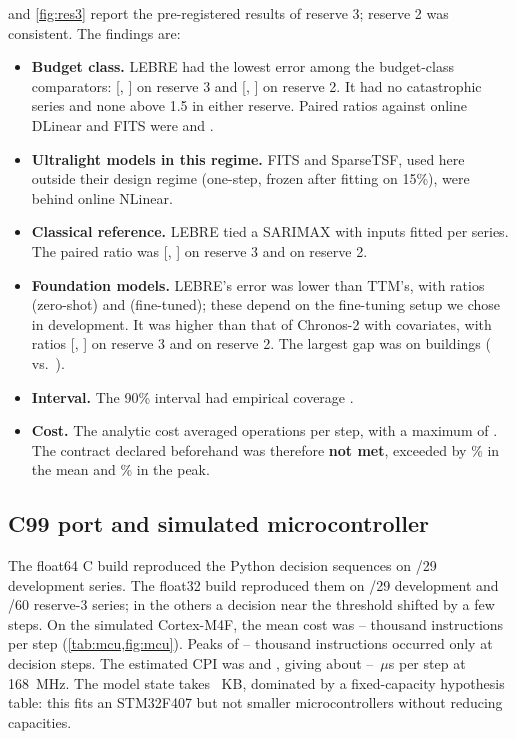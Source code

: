 \documentclass[11pt]{article}
\theoremstyle{remark}
\begin{document}
 and \cref{fig:res3} report the pre-registered results of reserve 3; reserve 2 was consistent. The findings are:
\begin{itemize}
  \item \textbf{Budget class.} LEBRE had the lowest error among the budget-class comparators: \rThreeAll{} [\rThreeLo, \rThreeHi] on reserve 3 and \rTwoAll{} [\rTwoLo, \rTwoHi] on reserve 2. It had no catastrophic series and none above 1.5 in either reserve. Paired ratios against online DLinear and FITS were \pairDl{} and \pairFits.
  \item \textbf{Ultralight models in this regime.} FITS and SparseTSF, used here outside their design regime (one-step, frozen after fitting on 15\%), were behind online NLinear.
  \item \textbf{Classical reference.} LEBRE tied a SARIMAX with inputs fitted per series. The paired ratio was \pairSar{} [\pairSarLo, \pairSarHi] on reserve 3 and \rTwoSar{} on reserve 2.
  \item \textbf{Foundation models.} LEBRE's error was lower than TTM's, with ratios \pairTtmZ{} (zero-shot) and \pairTtmF{} (fine-tuned); these depend on the fine-tuning setup we chose in development. It was higher than that of Chronos-2 with covariates, with ratios \pairChr{} [\pairChrLo, \pairChrHi] on reserve 3 and \rTwoChr{} on reserve 2. The largest gap was on buildings (\kLebBdg{} vs.\ \kChrBdg).
  \item \textbf{Interval.} The 90\% interval had empirical coverage \covThree.
  \item \textbf{Cost.} The analytic cost averaged \fpMean{} operations per step, with a maximum of \fpMax. The contract declared beforehand was therefore \textbf{not met}, exceeded by \fpOverMean\% in the mean and \fpOverMax\% in the peak.
\end{itemize}

\subsection{C99 port and simulated microcontroller}
The float64 C build reproduced the Python decision sequences on \eqDevD/29 development series. The float32 build reproduced them on \eqDevF/29 development and \eqThree/60 reserve-3 series; in the others a decision near the threshold shifted by a few steps. On the simulated Cortex-M4F, the mean cost was \instrMin--\instrMax{} thousand instructions per step (\cref{tab:mcu,fig:mcu}). Peaks of \peakMin--\peakMax{} thousand instructions occurred only at decision steps. The estimated CPI was \cpiA{} and \cpiB, giving about \usMin--\usMax~$\mu$s per step at 168~MHz. The model state takes \stateKB~KB, dominated by a fixed-capacity hypothesis table: this fits an STM32F407 but not smaller microcontrollers without reducing capacities.
\end{document}
